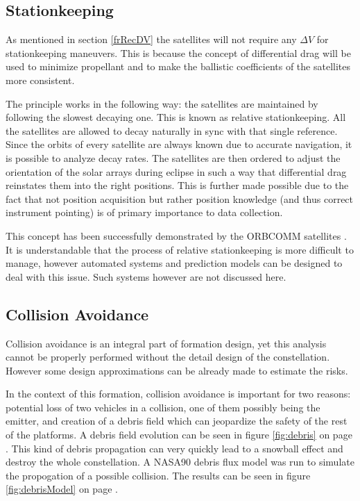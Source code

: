 \subsection{Stationkeeping}
\label{frSSStation}

As mentioned in section \ref{frRecDV} the satellites will not require any $\Delta V$ for stationkeeping maneuvers. This is because the concept of differential drag will be used to minimize propellant and to make the ballistic coefficients of the satellites more consistent.

The principle works in the following way: the satellites are maintained by following the slowest decaying one. This is known as relative stationkeeping. All the satellites are allowed to decay naturally in sync with that single reference. Since the orbits of every satellite are always known due to accurate navigation, it is possible to analyze decay rates. The satellites are then ordered to adjust the orientation of the solar arrays during eclipse in such a way that differential drag reinstates them into the right positions. This is further made possible due to the fact that not position acquisition but rather position knowledge (and thus correct instrument pointing) is of primary importance to data collection.

This concept has been successfully demonstrated by the ORBCOMM satellites \cite{constDesign}. It is understandable that the process of relative stationkeeping is more difficult to manage, however automated systems and prediction models can be designed to deal with this issue. Such systems however are not discussed here.  

\subsection{Collision Avoidance}
\label{frSSCA}

Collision avoidance is an integral part of formation design, yet this analysis cannot be properly performed without the detail design of the constellation. However some design approximations can be already made to estimate the risks.

In the context of this formation, collision avoidance is important for two reasons: potential loss of two vehicles in a collision, one of them possibly being the emitter, and creation of a debris field which can jeopardize the safety of the rest of the platforms. A debris field evolution can be seen in figure \ref{fig:debris} on page \pageref{fig:debris}. This kind of debris propagation can very quickly lead to a snowball effect and destroy the whole constellation. A NASA90 debris flux model was run to simulate the propogation of a possible collision. The results can be seen in figure \ref{fig:debrisModel} on page \pageref{fig:debrisModel}. 

